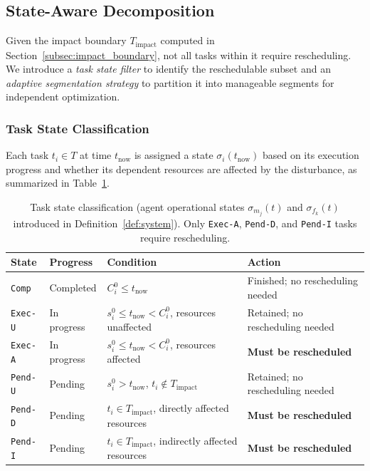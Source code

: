 \documentclass[manuscript,screen,review]{acmart}
\begin{document}
\subsection{State-Aware Decomposition}
\label{subsec:decomposition}

Given the impact boundary $T_{\mathrm{impact}}$ computed in
Section~\ref{subsec:impact_boundary}, not all tasks within it require
rescheduling. We introduce a \textit{task state filter} to identify the
reschedulable subset and an \textit{adaptive segmentation strategy} to
partition it into manageable segments for independent optimization.

\subsubsection{Task State Classification}

\begin{definition}
\label{def:task_state}
Each task $t_i \in T$ at time $t_{\mathrm{now}}$ is assigned a state
$\sigma_i(t_{\mathrm{now}})$ based on its execution progress and whether
its dependent resources are affected by the disturbance,
as summarized in Table~\ref{tab:task_states}.
\end{definition}

\begin{table}[h]
\centering
\caption{Task state classification (agent operational states 
$\sigma_{m_j}(t)$ and $\sigma_{f_k}(t)$ introduced in 
Definition~\ref{def:system}). Only \texttt{Exec-A}, \texttt{Pend-D},
         and \texttt{Pend-I} tasks require rescheduling.}
\label{tab:task_states}
\small
\begin{tabular}{@{}llll@{}}
\toprule
\textbf{State} & \textbf{Progress} & \textbf{Condition} & \textbf{Action} \\
\midrule
\texttt{Comp}
    & Completed
    & $C_i^0 \leq t_{\mathrm{now}}$
    & Finished; no rescheduling needed \\
\texttt{Exec-U}
    & In progress
    & $s_i^0 \leq t_{\mathrm{now}} < C_i^0$,\; resources unaffected
    & Retained; no rescheduling needed \\
\texttt{Exec-A}
    & In progress
    & $s_i^0 \leq t_{\mathrm{now}} < C_i^0$,\; resources affected
    & \textbf{Must be rescheduled} \\
\texttt{Pend-U}
    & Pending
    & $s_i^0 > t_{\mathrm{now}}$,\; $t_i \notin T_{\mathrm{impact}}$
    & Retained; no rescheduling needed \\
\texttt{Pend-D}
    & Pending
    & $t_i \in T_{\mathrm{impact}}$,\; directly affected resources
    & \textbf{Must be rescheduled} \\
\texttt{Pend-I}
    & Pending
    & $t_i \in T_{\mathrm{impact}}$,\; indirectly affected resources
    & \textbf{Must be rescheduled} \\
\bottomrule
\end{tabular}
\end{table}
\end{document}
